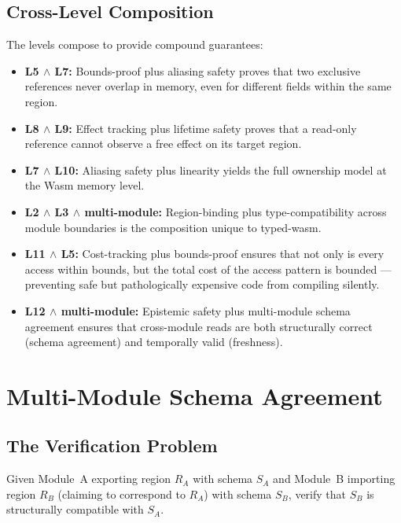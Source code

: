 \documentclass[sigplan,nonacm,screen]{acmart}
\begin{document}
\subsection{Cross-Level Composition}

The levels compose to provide compound guarantees:

\begin{itemize}
  \item \textbf{L5 $\wedge$ L7:} Bounds-proof plus aliasing safety proves
    that two exclusive references never overlap in memory, even for different
    fields within the same region.
  \item \textbf{L8 $\wedge$ L9:} Effect tracking plus lifetime safety proves
    that a read-only reference cannot observe a free effect on its target region.
  \item \textbf{L7 $\wedge$ L10:} Aliasing safety plus linearity yields the
    full ownership model at the Wasm memory level.
  \item \textbf{L2 $\wedge$ L3 $\wedge$ multi-module:} Region-binding plus
    type-compatibility across module boundaries is the composition unique to
    typed-wasm.
  \item \textbf{L11 $\wedge$ L5:} Cost-tracking plus bounds-proof ensures
    that not only is every access within bounds, but the total cost of the
    access pattern is bounded --- preventing safe but pathologically expensive
    code from compiling silently.
  \item \textbf{L12 $\wedge$ multi-module:} Epistemic safety plus
    multi-module schema agreement ensures that cross-module reads are both
    structurally correct (schema agreement) and temporally valid (freshness).
\end{itemize}

\section{Multi-Module Schema Agreement}
\label{sec:multimodule}

\subsection{The Verification Problem}

Given Module~A exporting region $R_A$ with schema $S_A$ and Module~B
importing region $R_B$ (claiming to correspond to $R_A$) with schema
$S_B$, verify that $S_B$ is structurally compatible with $S_A$.
\end{document}
